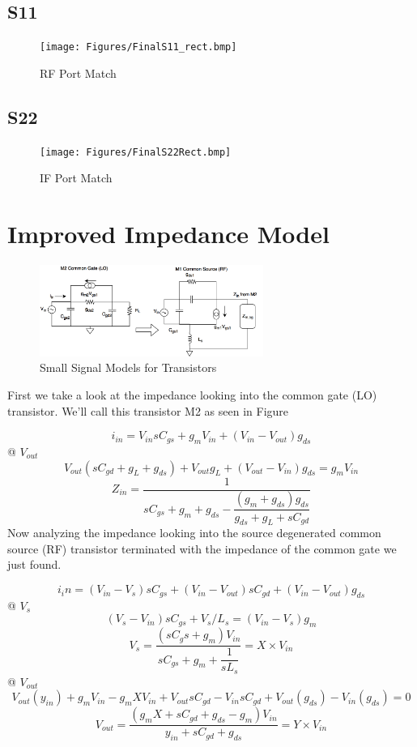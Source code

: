 \documentclass{article}                                                         %
\begin{document}
\begin{appendices}
\subsection{S11}
\begin{figure}[H]
  \centering
  \texttt{[image: Figures/FinalS11\_rect.bmp]}
  \caption{RF Port Match}
    \label{fig:cS11}
\end{figure}
\subsection{S22}
\begin{figure}[H]
  \centering
  \texttt{[image: Figures/FinalS22Rect.bmp]}
  \caption{IF Port Match}
    \label{fig:cS22}
\end{figure}

\newpage
\section{Improved Impedance Model}\label{app:imp}
\begin{figure}[H]
  \centering
  \includegraphics[width=0.65\textwidth] {Figures/smallsignal.png}
  \caption{Small Signal Models for Transistors}
    \label{fig:smallsig}
\end{figure}
First we take a look at the impedance looking into the common gate (LO) transistor. We'll call this
transistor M2 as seen in Figure

$$ i_{in} = V_{in}sC_{gs}+ g_mV_{in} +(V_{in}-V_{out})g_{ds} $$
@ $V_{out}$
$$V_{out}(sC_{gd}+g_L+g_{ds}) + V_{out}g_L + (V_{out}-V_{in})g_{ds} = g_mV_{in} $$
$$ Z_{in} = \dfrac{1}{sC_{gs}+g_m+g_{ds}-\dfrac{(g_m+g_{ds})g_{ds}}{g_{ds}+g_L+sC_{gd}}}$$
Now analyzing the impedance looking into the source degenerated common source (RF) transistor terminated
with the impedance of the common gate we just found.

$$i_in = (V_{in} - V_s)sC_{gs}+(V_{in}-V_{out})sC_{gd}+(V_{in}-V_{out})g_{ds}$$
@ $V_s$
$$ (V_s-V_{in})sC_{gs}+V_s/L_s = (V_{in}-V_s)g_m$$
$$ V_s = \dfrac{(sC_gs+g_m)V_{in}}{sC_{gs}+g_m+\dfrac{1}{sL_s}} = X\times V_{in}$$
@ $V_{out}$
$$ V_{out}(y_{in}) +g_mV_{in}-g_mXV_{in} +V_{out}sC_{gd}-V_{in}sC_{gd}+V_{out}(g_{ds})-V_{in}(g_{ds}) = 0$$
$$ V_{out} = \dfrac{(g_mX+sC_{gd}+g_{ds}-g_m)V_{in}}{y_{in}+sC_{gd}+g_{ds}}= Y\times V_{in}$$


\end{appendices}
\end{document}
